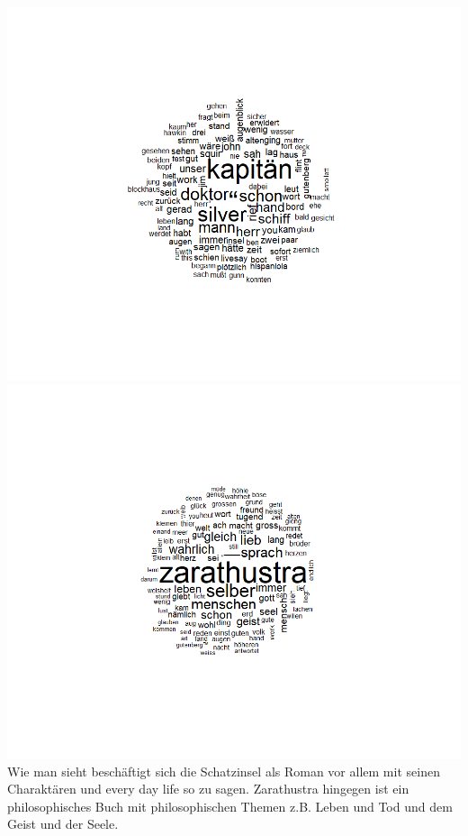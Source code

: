 \documentclass{scrartcl}
\begin{document}
\includegraphics*[scale=0.6]{SchatzinselWordcloud.png}\\
\includegraphics*[scale=0.6]{zarathustraWordcloud.png}\\
Wie man sieht beschäftigt sich die Schatzinsel als Roman vor allem mit seinen Charaktären und every day life so zu sagen. Zarathustra hingegen ist ein philosophisches Buch mit philosophischen Themen z.B. Leben und Tod und dem Geist und der Seele.
\end{document}
